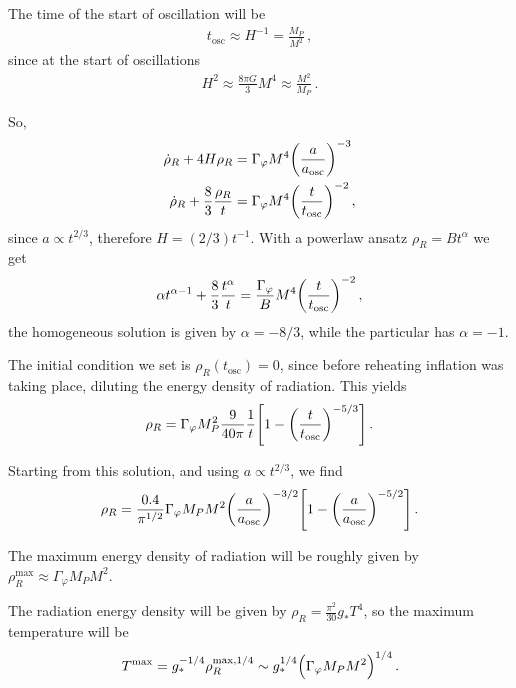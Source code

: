 \documentclass[main.tex]{subfiles}
\begin{document}
The time of the start of oscillation will be 
%
\begin{align}
t _{\text{osc}} \approx H^{-1} = \frac{M_P}{M^2}
\,,
\end{align}
%
since at the start of oscillations
%
\begin{align}
H^2 \approx \frac{8 \pi G}{3} M^{4} \approx \frac{M^2}{M_P}
\,.
\end{align}

So, 
%
\begin{align}
\dot{\rho}_R + 4 H \rho _R &= \Gamma _\varphi M^4  \qty( \frac{a}{a _{\text{osc}}})^{-3} \\
\dot{\rho}_R + \frac{8}{3} \frac{\rho _R}{t} &=
\Gamma _\varphi M^{4} \qty( \frac{t}{t _{\text{osc}}})^{-2} 
\,,
\end{align}
%
since \(a \propto t^{2/3}\), therefore \(H = (2/3) t^{-1}\).
With a powerlaw ansatz \(\rho _R = B t^{\alpha }\) we get 
%
\begin{align}
\alpha t^{\alpha -1} + \frac{8}{3} \frac{t^{\alpha }}{t} = \frac{\Gamma _\varphi }{B} M^{4} \qty(\frac{t}{ t _{\text{osc}}})^{-2}
\,,
\end{align}
%
the homogeneous solution is given by \(\alpha = - 8 /3\), while the particular has \(\alpha = -1\). 

The initial condition we set is \(\rho _R (t _{\text{osc}}) = 0\), since before reheating inflation was taking place, diluting the energy density of radiation. 
This yields 
%
\begin{align}
\rho _R = \Gamma _\varphi M_P^2 \frac{9}{40 \pi } \frac{1}{t} \qty[ 1 - \qty( \frac{t}{t _{\text{osc}}})^{-5/3}]
\,.
\end{align}



Starting from this solution, and using \(a \propto t^{2/3}\), we find 
%
\begin{align}
\rho _R = \frac{\num{.4}}{\pi^{1/2}} \Gamma _\varphi M_P M^2 \qty(\frac{a}{a _{\text{osc}}})^{-3/2} \qty[1 - \qty(\frac{a}{a _{\text{osc}}})^{- 5/2}]
\,.
\end{align}

The maximum energy density of radiation will be roughly given by \(\rho _R^{\text{max}} \approx \Gamma _\varphi M_P M^2\). 

The radiation energy density will be given by \(\rho _R = \frac{\pi^2}{30} g_* T^{4}\), so the maximum temperature will be 
%
\begin{align}
T^{\text{max}} = g_*^{-1/4} \rho _R^{\text{max}, 1/4} \sim g_*^{1/4} \qty(\Gamma _\varphi M_P M^2)^{1/4}
\,.
\end{align}
\end{document}
